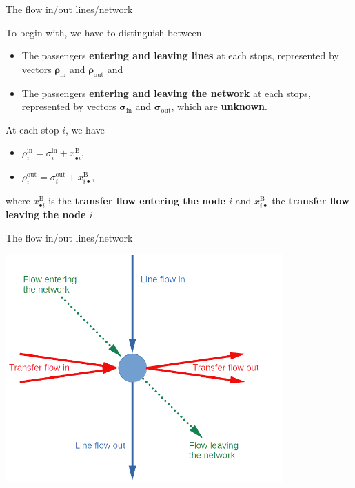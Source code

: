 \documentclass[10pt]{beamer}
\newcommand{\imp}[1]{\textbf{\color{cyan}#1}}
\begin{document}
	
	\begin{frame}{The flow in/out lines/network}
		
		To begin with, we have to distinguish between
		
		\begin{itemize}
			\item The passengers \imp{entering and leaving lines} at each stops, represented by vectors \imp{$\bm{\rho}_\text{in}$} and \imp{$\bm{\rho}_\text{out}$} and 
			\item The passengers \imp{entering and leaving the network} at each stops, represented by vectors \imp{$\bm{\sigma}_\text{in}$} and \imp{$\bm{\sigma}_\text{out}$}, which are \imp{unknown}.
		\end{itemize}
	
		At each stop $i$, we have 
		
		\begin{itemize}
			\item $\rho^\text{in}_i = \sigma^\text{in}_i + x^\text{B}_{\bullet i}$,
			\item $\rho^\text{out}_i = \sigma^\text{out}_i + x^\text{B}_{i \bullet}$,
		\end{itemize}
		
		where $x^\text{B}_{\bullet i}$ is the \imp{transfer flow entering the node $i$} and $x^\text{B}_{i \bullet}$ the \imp{transfer flow leaving the node $i$}. \\
	\end{frame}
	
	
	\begin{frame}{The flow in/out lines/network}
		\begin{center}
			\hspace{0.1cm} \includegraphics[width=0.8\textwidth]{img/flow_balance.png}
		\end{center}
	\end{frame}
	
\end{document}
